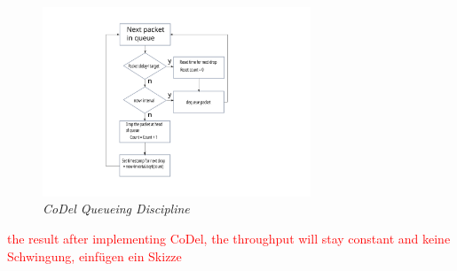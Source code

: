 \begin{figure}[h]
\centering
\includegraphics*[width=8cm]{codel}
\caption{\em CoDel Queueing Discipline}
\label{fig:tcp}
\end{figure}

\textcolor{red}{the result after implementing CoDel, the throughput will stay constant and keine Schwingung, einfügen ein Skizze}
